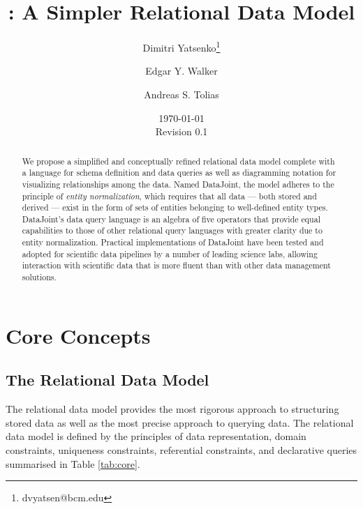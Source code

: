 \documentclass[letter,10pt]{article}
\author[1,2]{Dimitri Yatsenko\thanks{dvyatsen@bcm.edu}}
\author[1,2]{Edgar Y. Walker}
\author[1,2]{Andreas S. Tolias}
\affil[1]{Department of Neuroscience, Baylor College of Medicine, Houston, Texas, USA}
\affil[2]{Vathes LLC, Houston, Texas, USA}
\date{\today\\Revision 0.1}
\title{\datajoint: A Simpler Relational Data Model}
\newcommand{\datajoint}{DataJoint\xspace}
\begin{document}
\maketitle
\begin{abstract}
We propose a simplified and conceptually refined relational data model complete with a language for schema definition and data queries as well as  diagramming notation for visualizing relationships among the data.  
Named \datajoint, the model adheres to the principle of \emph{entity normalization}, which requires that all data --- both stored and derived --- exist in the form of sets of entities belonging to well-defined entity types.  
\datajoint's data query language is an algebra of five operators that provide equal capabilities to those of other relational query languages with greater clarity due to entity normalization. 
Practical implementations of \datajoint have been tested and adopted for scientific data pipelines by a number of leading science labs, allowing interaction with scientific data that is more fluent than with other data management solutions.
\end{abstract}
\tableofcontents 

\twocolumn

\section{Core Concepts}
\subsection{The Relational Data Model}
The relational data model \citep{codd_relational_1970} provides the most rigorous approach to structuring stored data as well as the most precise approach to querying data.  
The relational data model is defined by the principles of data representation, domain constraints, uniqueness constraints, referential constraints, and declarative queries summarised in Table \ref{tab:core}.
\end{document}
